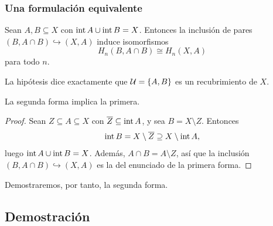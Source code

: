 \begin{frame}[allowframebreaks]
  \frametitle{Una formulación equivalente}

  \begin{theorem}
    Sean $A,B\subseteq X$ con $\operatorname{int} A\cup\operatorname{int} B=X$. Entonces la inclusión
    de pares $(B,A\cap B)\hookrightarrow(X,A)$ induce isomorfismos
    \[
      H_n(B,A\cap B)\cong H_n(X,A)
    \]
    para todo $n$.
  \end{theorem}

  \medskip

  La hipótesis dice
  exactamente que $\mathcal{U}=\{A,B\}$ es un recubrimiento de $X$.

  \medskip

  \begin{center}
  \end{center}

  \framebreak

  \begin{proposition}
    La segunda forma implica la primera.
  \end{proposition}

  \begin{proof}
    Sean $Z\subseteq A\subseteq X$ con $\overline{Z}\subseteq\operatorname{int} A$, y sea
    $B=X\setminus Z$. Entonces
    \[
      \operatorname{int} B=X\setminus\overline{Z}\supseteq X\setminus\operatorname{int} A,
    \]
    luego $\operatorname{int} A\cup\operatorname{int} B=X$. Además, $A\cap B=A\setminus Z$, así que la
    inclusión $(B,A\cap B)\hookrightarrow(X,A)$ es la del enunciado de la
    primera forma.
  \end{proof}

  \medskip

  Demostraremos, por tanto, la segunda forma.
\end{frame}

\subsection{Demostración}

